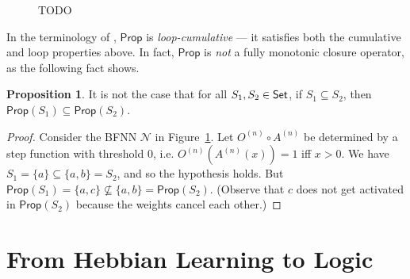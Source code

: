 \documentclass[letterpaper]{article}
\theoremstyle{definition}
\newtheorem{proposition}{Proposition}
\newcommand{\Set}{\mbox{\sf Set}}
\newcommand{\set}[1]{\{ #1 \}}
\newcommand{\Prop}{\textsf{Prop}}
\newcommand{\Net}{\mathcal{N}}
\begin{document}
\begin{figure}
{
}
\caption{\textcolor{myred}{TODO}}
\label{fig:monotonicity-counterexamples}
\end{figure}

In the terminology of \citep{kraus1990nonmonotonic}, $\Prop$ is \emph{loop-cumulative} --- it satisfies both the cumulative and loop properties above.  In fact, $\Prop$ is \emph{not} a fully monotonic closure operator, as the following fact shows.

\begin{proposition}
It is not the case that for all $S_1, S_2 \in \Set$, if $S_1 \subseteq S_2$, then $\Prop(S_1) \subseteq \Prop(S_2)$.
\end{proposition}
\begin{proof}
Consider the BFNN $\Net$ in Figure~\ref{fig:monotonicity-counterexamples}. Let $O^{(n)} \circ A^{(n)}$ be determined by a step function with threshold $0$, i.e. $O^{(n)}(A^{(n)}(x)) = 1$ iff $x > 0$.  We have $S_1 = \set{a} \subseteq \set{a, b} = S_2$, and so the hypothesis holds. But $\Prop(S_1) = \set{a, c} \not \subseteq \set{a, b} = \Prop(S_2)$. (Observe that $c$ does not get activated in $\Prop(S_2)$ because the weights cancel each other.)
\end{proof}


\section{From Hebbian Learning to Logic}
\end{document}
